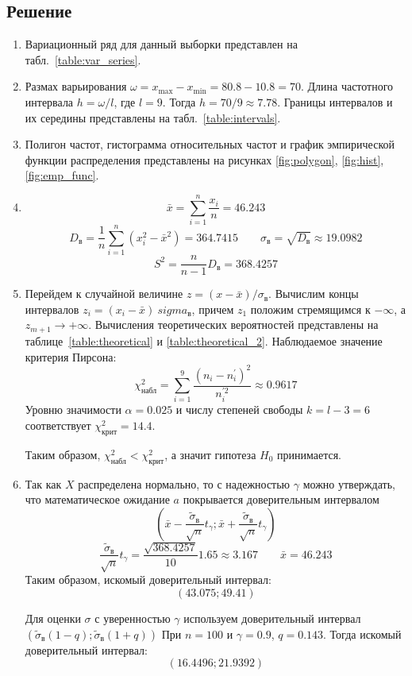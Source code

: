\documentclass{article}
\theoremstyle{problemstyle}
\begin{document}
\subsection{Решение}
\begin{enumerate}
  \item Вариационный ряд для данный выборки представлен на табл.~\ref{table:var_series}.
  \item Размах варьирования \(\omega = x_{\max} - x_{\min} = 80.8 - 10.8 = 70\).
    Длина частотного интервала \(h = \omega / l\), где \(l = 9\).
    Тогда \(h = 70/9 \approx 7.78\).
    Границы интервалов и их середины представлены на табл.~\ref{table:intervals}.
  \item Полигон частот, гистограмма относительных частот и
    график эмпирической функции распределения представлены на рисунках
    \ref{fig:polygon}, \ref{fig:hist}, \ref{fig:emp_func}.
  \item
    \[ \bar x = \sum_{i = 1}^n \frac{x_i}{n} = 46.243 \]
    \[
      D_\text{в} =
      \frac{1}{n} \sum_{i=1}^n \left( x_i^2 - \bar x^2 \right) =
      364.7415
      \qquad
      \sigma_\text{в} =
      \sqrt{D_\text{в}} \approx
      19.0982
    \]
    \[ S^2 = \frac{n}{n-1} D_\text{в} = 368.4257 \]
  \item Перейдем к случайной величине \(z = (x - \bar x) / \sigma_\text{в} \).
    Вычислим концы интервалов \(z_i = (x_i - \bar x) \ sigma_\text{в} \),
    причем $z_1$ положим стремящимся к $-\infty$, а $z_{m+1} \to +\infty$.
    Вычисления теоретических вероятностей представлены на таблице~\ref{table:theoretical} и \ref{table:theoretical_2}.
    Наблюдаемое значение критерия Пирсона:
    \[
      \chi_\text{набл}^2 = 
      \sum_{i=1}^9 \frac{(n_i - n^\prime_i)^2}{ n_i^{\prime2}} \approx
      0.9617
    \]
    Уровню значимости \(\alpha = 0.025\) и числу степеней свободы \(k = l - 3 = 6\) 
    соответствует $\chi^2_\text{крит} = 14.4 $.
    
    Таким образом, \(\chi^2_\text{набл} < \chi^2_\text{крит}\), а значит гипотеза
    \(H_0\) принимается.

  \item Так как \(X\) распределена нормально, то с надежностью \(\gamma\)
    можно утверждать, что математическое ожидание \(a\) покрывается
    доверительным интервалом
    \[
      \left(
      \bar x - \frac{\tilde\sigma_\text{в}}{\sqrt{n}} t_\gamma
      ;
      \bar x + \frac{\tilde\sigma_\text{в}}{\sqrt{n}} t_\gamma
      \right)
    \]
    \[
      \frac{\tilde\sigma_\text{в}}{\sqrt{n}} t_\gamma = \frac{\sqrt{368.4257}}{10} 1.65 \approx 3.167
      \qquad
      \bar x = 46.243
    \]
    Таким образом, искомый доверительный интервал:
    \[
      (43.075; 49.41)
    \]

    Для оценки $\sigma$ с уверенностью $\gamma$ используем
    доверительный интервал \( (\tilde\sigma_\text{в} (1 - q); \tilde\sigma_\text{в} (1+q)) \)
    При $n = 100$ и $\gamma = 0.9$, $q = 0.143$. Тогда искомый доверительный интервал:
    \[ (16.4496; 21.9392) \]
\end{enumerate}
\end{document}
